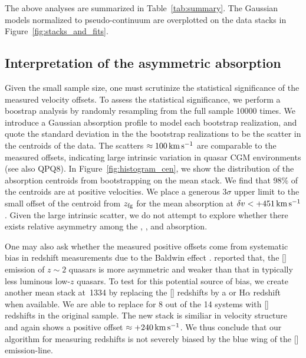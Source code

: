 \documentclass[iop]{emulateapj}
\begin{document}
The above analyses are summarized in Table~\ref{tab:summary}. The 
Gaussian models normalized to pseudo-continuum are overplotted on the data stacks in 
Figure~\ref{fig:stacks_and_fits}. 


%

\subsection{Interpretation of the asymmetric absorption}
\label{sec:significance_+ve}

Given the small sample size, one must scrutinize the statistical significance of the measured 
velocity offsets. To assess the statistical significance, we perform a boostrap analysis by 
randomly resampling from the full sample 10000 times. We introduce a Gaussian absorption profile 
to model each bootstrap realization, and quote the standard deviation in the the bootstrap 
realizations to be the scatter in the centroids of the data. The scatters 
$\approx100\,{\rm km\,s^{-1}}$ are comparable to the measured offsets, indicating large intrinsic 
variation in quasar CGM environments (see also QPQ8). In Figure~\ref{fig:histogram_cen}, we show 
the distribution of the absorption centroids from bootstrapping on the  mean stack. We 
find that 98\% of the centroids are at positive velocities. We place a generous $3\sigma$ upper 
limit to the small offset of the centroid from $z_{\rm fg}$ for the  mean absorption at 
$\delta v<+451\,{\rm km\,s^{-1}}$. Given the large intrinsic scatter, we do not attempt to explore 
whether there exists relative asymmetry among the , , and  
absorption. 

One may also ask whether the measured positive offsets come from systematic bias in redshift 
measurements due to the Baldwin effect \citep{Baldwin77}. \cite{Shen16} reported that, the 
[] emission of $z\sim2$ quasars is more asymmetric and weaker than that in typically 
less luminous low-$z$ quasars. To test for this potential source of bias, we create another mean 
stack at \,1334 by replacing the [] redshifts by a  or H$\alpha$ 
redshift when available. We are able to replace for 8 out of the 14 systems with [] 
redshifts in the original sample. The new stack is similiar in velocity structure and again shows 
a positive offset $\approx+240\,{\rm km\,s^{-1}}$. We thus conclude that our algorithm for 
measuring redshifts is not severely biased by the blue wing of the [] emission-line. 
\end{document}
